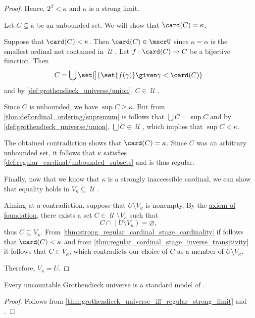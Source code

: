 \begin{proof}
  Hence, \( 2^\beta < \kappa \) and \( \kappa \) is a strong limit.

   Let \( C \subseteq \kappa \) be an unbounded set. We will show that \( \card(C) = \kappa \).

  Suppose that \( \card(C) < \kappa \). Then \( \card(C) \in \mscrU \) since \( \kappa = \alpha \) is the smallest ordinal not contained in \( \mscrU \). Let \( f: \card(C) \to C \) be a bijective function. Then
  \begin{equation*}
    C = \bigcup\set[\big]{ \set{ f(\gamma) } \given \gamma < \card(C) }
  \end{equation*}
  and by \ref{def:grothendieck_universe/union}, \( C \in \mscrU \).

  Since \( C \) is unbounded, we have \( \sup C \geq \kappa \). But from \cref{thm:def:ordinal_ordering/supremum} is follows that \( \bigcup C = \sup C \) and by \ref{def:grothendieck_universe/union}, \( \bigcup C \in \mscrU \), which implies that \( \sup C < \kappa \).

  The obtained contradiction shows that \( \card(C) = \kappa \). Since \( C \) was an arbitrary unbounded set, it follows that \( \kappa \) satisfies \cref{def:regular_cardinal/unbounded_subsets} and is thus regular.

   Finally, now that we know that \( \kappa \) is a strongly inaccessible cardinal, we can show that equality holds in \( V_\kappa \subseteq \mscrU \).

  Aiming at a contradiction, suppose that \( U \setminus V_\kappa \) is nonempty. By the \hyperref[def:zfc/foundation]{axiom of foundation}, there exists a set \( C \in \mscrU \setminus V_\kappa \) such that
  \begin{equation*}
    C \cap (U \setminus V_\kappa) = \varnothing,
  \end{equation*}
  thus \( C \subseteq V_\kappa \). From \cref{thm:strong_regular_cardinal_stage_cardinality} if follows that \( \card(C) < \kappa \) and from \cref{thm:regular_cardinal_stage_inverse_transitivity} it follows that \( C \in V_\kappa \), which contradicts our choice of \( C \) as a member of \( U \setminus V_\kappa \).

  Therefore, \( V_\kappa = U \).
\end{proof}

\begin{corollary}\label{thm:grothendieck_universe_is_model_of_zfc}
  Every uncountable Grothendieck universe is a standard model of \hyperref[def:zfc]{}.
\end{corollary}
\begin{proof}
  Follows from \cref{thm:grothendieck_universe_iff_regular_strong_limit} and .
\end{proof}
